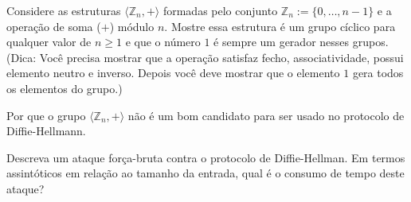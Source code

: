 \begin{exercicio}
  Considere as estruturas $\langle \mathbb{Z}_n, + \rangle$ formadas pelo conjunto $\mathbb{Z}_n := \{0, \dots, n-1\}$ e a operação de soma ($+$) módulo $n$.
  Mostre essa estrutura é um grupo cíclico para qualquer valor de $n \geq 1$ e que o número $1$ é sempre um gerador nesses grupos. (Dica: Você precisa mostrar que a operação satisfaz fecho, associatividade, possui elemento neutro e inverso. Depois você deve mostrar que o elemento $1$ gera todos os elementos do grupo.)

  Por que o grupo $\langle \mathbb{Z}_n, +\rangle$ não é um bom candidato para ser usado no protocolo de Diffie-Hellmann.
\end{exercicio}

\begin{exercicio}
  Descreva um ataque força-bruta contra o protocolo de Diffie-Hellman.
  Em termos assintóticos em relação ao tamanho da entrada, qual é o consumo de tempo deste ataque?
\end{exercicio}
